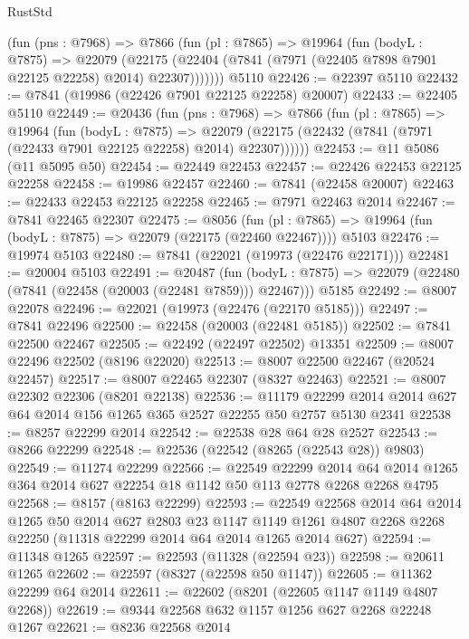 \begin{lexlean}{RustStd}
\begin{coremodule}
{\begin{coremodule}
{{{{{{{{{{{{{{{{{{{{{{{{{{{{{{{{{{{{{{{{{{{{{{{{{{{{{{      (fun (pns : @7968) =>
      @7866
        (fun (pl : @7865) =>
        @19964
          (fun (bodyL : @7875) =>
          @22079
            (@22175 (@22404 (@7841 (@7971 (@22405 @7898 @7901 @22125 @22258) @2014) @22307)))))))
    @5110
@22426 := @22397 @5110
@22432 := @7841 (@19986 (@22426 @7901 @22125 @22258) @20007)
@22433 := @22405 @5110
@22449 := @20436
    (fun (pns : @7968) =>
    @7866
      (fun (pl : @7865) =>
      @19964
        (fun (bodyL : @7875) =>
        @22079 (@22175 (@22432 (@7841 (@7971 (@22433 @7901 @22125 @22258) @2014) @22307))))))
@22453 := @11 @5086 (@11 @5095 @50)
@22454 := @22449 @22453
@22457 := @22426 @22453 @22125 @22258
@22458 := @19986 @22457
@22460 := @7841 (@22458 @20007)
@22463 := @22433 @22453 @22125 @22258
@22465 := @7971 @22463 @2014
@22467 := @7841 @22465 @22307
@22475 := @8056
    (fun (pl : @7865) => @19964 (fun (bodyL : @7875) => @22079 (@22175 (@22460 @22467))))
    @5103
@22476 := @19974 @5103
@22480 := @7841 (@22021 (@19973 (@22476 @22171)))
@22481 := @20004 @5103
@22491 := @20487
    (fun (bodyL : @7875) => @22079 (@22480 (@7841 (@22458 (@20003 (@22481 @7859))) @22467)))
    @5185
@22492 := @8007 @22078
@22496 := @22021 (@19973 (@22476 (@22170 @5185)))
@22497 := @7841 @22496
@22500 := @22458 (@20003 (@22481 @5185))
@22502 := @7841 @22500 @22467
@22505 := @22492 (@22497 @22502) @13351
@22509 := @8007 @22496 @22502 (@8196 @22020)
@22513 := @8007 @22500 @22467 (@20524 @22457)
@22517 := @8007 @22465 @22307 (@8327 @22463)
@22521 := @8007 @22302 @22306 (@8201 @22138)
@22536 := @11179
    @22299
    @2014
    @2014
    @627
    @64
    @2014
    @156
    @1265
    @365
    @2527
    @22255
    @50
    @2757
    @5130
    @2341
@22538 := @8257 @22299 @2014
@22542 := @22538 @28 @64 @28 @2527
@22543 := @8266 @22299
@22548 := @22536 (@22542 (@8265 (@22543 @28)) @9803)
@22549 := @11274 @22299
@22566 := @22549
    @22299
    @2014
    @64
    @2014
    @1265
    @364
    @2014
    @627
    @22254
    @18
    @1142
    @50
    @113
    @2778
    @2268
    @2268
    @4795
@22568 := @8157 (@8163 @22299)
@22593 := @22549
    @22568
    @2014
    @64
    @2014
    @1265
    @50
    @2014
    @627
    @2803
    @23
    @1147
    @1149
    @1261
    @4807
    @2268
    @2268
    @22250
    (@11318 @22299 @2014 @64 @2014 @1265 @2014 @627)
@22594 := @11348 @1265
@22597 := @22593 (@11328 (@22594 @23))
@22598 := @20611 @1265
@22602 := @22597 (@8327 (@22598 @50 @1147))
@22605 := @11362 @22299 @64 @2014
@22611 := @22602 (@8201 (@22605 @1147 @1149 @4807 @2268))
@22619 := @9344 @22568 @632 @1157 @1256 @627 @2268 @22248 @1267
@22621 := @8236 @22568 @2014
}}}}}}}}}}}}}}}}}}}}}}}}}}}}}}}}}}}}}}}}}}}}}}}}}}}}}}
\end{coremodule}}
\end{coremodule}
\end{lexlean}
